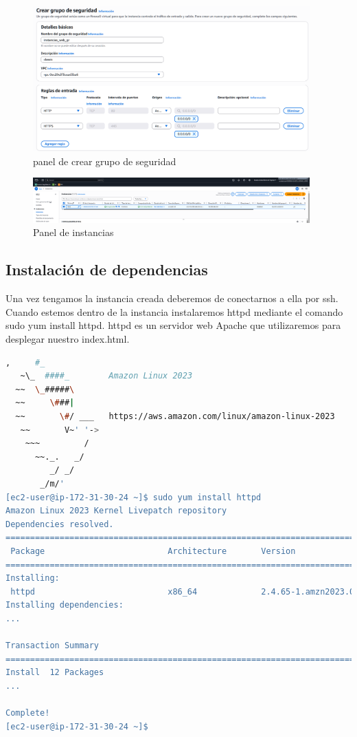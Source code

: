 \documentclass{article}
\begin{document}
	\begin{figure}[H]
	\centering
	\includegraphics[width=0.95\textwidth]{crear_grupo_seguridad.png}
	\caption{panel de crear grupo de seguridad}
	\end{figure}

	\begin{figure}[H]
	\centering
	\includegraphics[width=0.95\textwidth]{pestanya_instancias.png}
	\caption{Panel de instancias}
	\end{figure}
\newpage

	\subsection{Instalación de dependencias}

		Una vez tengamos la instancia creada deberemos de conectarnos a ella por ssh. Cuando estemos dentro de la instancia instalaremos httpd mediante el comando sudo yum install httpd. httpd es un servidor web Apache que utilizaremos para desplegar nuestro index.html.


\begin{lstlisting}[style=consola, language=bash, caption={Terminal, dependencias}]
   ,     #_
   ~\_  ####_        Amazon Linux 2023
  ~~  \_#####\
  ~~     \###|
  ~~       \#/ ___   https://aws.amazon.com/linux/amazon-linux-2023
   ~~       V~' '->
    ~~~         /
      ~~._.   _/
         _/ _/
       _/m/'
[ec2-user@ip-172-31-30-24 ~]$ sudo yum install httpd
Amazon Linux 2023 Kernel Livepatch repository                                           177 kB/s |  23 kB     00:00
Dependencies resolved.
==================================================================================
 Package                         Architecture       Version                               Repository               Size
==================================================================================
Installing:
 httpd                           x86_64             2.4.65-1.amzn2023.0.1                 amazonlinux              47 k
Installing dependencies:
...

Transaction Summary
==================================================================================
Install  12 Packages
...

Complete!
[ec2-user@ip-172-31-30-24 ~]$

\end{lstlisting}
\end{document}
